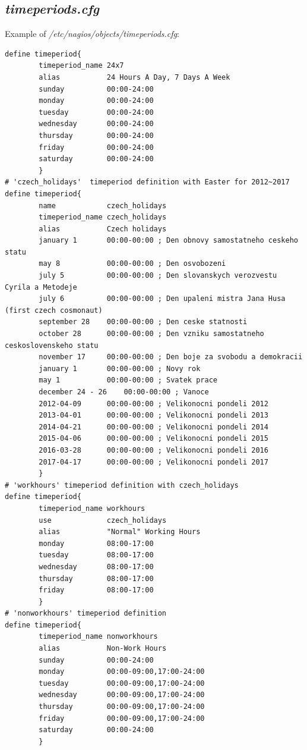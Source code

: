 \documentclass[10pt,a4paper,final]{report}
\begin{document}
\subsection{\emph{timeperiods.cfg}}
Example of \emph{/etc/nagios/objects/timeperiods.cfg}:
\begin{lstlisting}
define timeperiod{
        timeperiod_name 24x7
        alias           24 Hours A Day, 7 Days A Week
        sunday          00:00-24:00
        monday          00:00-24:00
        tuesday         00:00-24:00
        wednesday       00:00-24:00
        thursday        00:00-24:00
        friday          00:00-24:00
        saturday        00:00-24:00
        }
# 'czech_holidays'  timeperiod definition with Easter for 2012~2017
define timeperiod{
		name			czech_holidays
        timeperiod_name czech_holidays
        alias           Czech holidays
        january 1       00:00-00:00 ; Den obnovy samostatneho ceskeho statu
        may 8           00:00-00:00 ; Den osvobozeni
        july 5          00:00-00:00 ; Den slovanskych verozvestu Cyrila a Metodeje
        july 6          00:00-00:00 ; Den upaleni mistra Jana Husa (first czech cosmonaut)
        september 28    00:00-00:00 ; Den ceske statnosti
        october 28      00:00-00:00 ; Den vzniku samostatneho ceskoslovenskeho statu
        november 17     00:00-00:00 ; Den boje za svobodu a demokracii
        january 1       00:00-00:00 ; Novy rok
        may 1           00:00-00:00 ; Svatek prace
        december 24 - 26    00:00-00:00 ; Vanoce
        2012-04-09      00:00-00:00 ; Velikonocni pondeli 2012
        2013-04-01      00:00-00:00 ; Velikonocni pondeli 2013
        2014-04-21      00:00-00:00 ; Velikonocni pondeli 2014
        2015-04-06      00:00-00:00 ; Velikonocni pondeli 2015
        2016-03-28      00:00-00:00 ; Velikonocni pondeli 2016
        2017-04-17      00:00-00:00 ; Velikonocni pondeli 2017	
        }
# 'workhours' timeperiod definition with czech_holidays
define timeperiod{
        timeperiod_name workhours
        use				czech_holidays
        alias           "Normal" Working Hours
        monday          08:00-17:00
        tuesday         08:00-17:00
        wednesday       08:00-17:00
        thursday        08:00-17:00
        friday          08:00-17:00
        }
# 'nonworkhours' timeperiod definition
define timeperiod{
        timeperiod_name nonworkhours
        alias           Non-Work Hours
        sunday          00:00-24:00
        monday          00:00-09:00,17:00-24:00
        tuesday         00:00-09:00,17:00-24:00
        wednesday       00:00-09:00,17:00-24:00
        thursday        00:00-09:00,17:00-24:00
        friday          00:00-09:00,17:00-24:00
        saturday        00:00-24:00
        }
\end{lstlisting}
\end{document}
